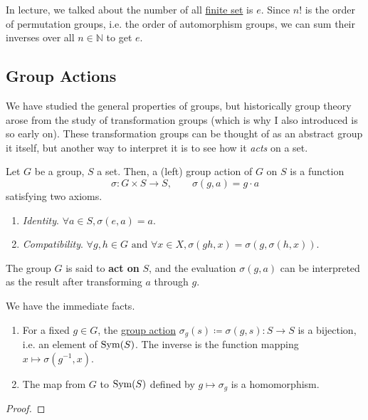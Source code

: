  In lecture, we talked about the number of all \hyperref[st-def:finite-set]{finite set} is $e$. Since $n!$ is the order of permutation groups, i.e. the order of automorphism groups, we can sum their inverses over all $n \in \mathbb{N}$ to get $e$.  

\subsection{Group Actions} 

  We have studied the general properties of groups, but historically group theory arose from the study of transformation groups (which is why I also introduced is so early on). These transformation groups can be thought of as an abstract group it itself, but another way to interpret it is to see how it \textit{acts} on a set. 

  \begin{definition}
    \label{def:group-action}
    Let $G$ be a group, $S$ a set. Then, a (left) group action of $G$ on $S$ is a function
    \begin{equation}
      \sigma: G \times S \to S, \qquad \sigma(g, a) = g \cdot a 
    \end{equation}
    satisfying two axioms. 
    \begin{enumerate}
      \item \textit{Identity}. $\forall a \in S, \sigma(e, a) = a$. 
      \item \textit{Compatibility}. $\forall g, h \in G \text{ and } \forall x \in X, \sigma(gh, x) = \sigma(g, \sigma(h, x))$.
    \end{enumerate}
    The group $G$ is said to \textbf{act on} $S$, and the evaluation $\sigma(g, a)$ can be interpreted as the result after transforming $a$ through $g$. 
  \end{definition}
  
  \begin{theorem}
    \label{thm:group-action-as-a-homomorphism-onto-the}
    We have the immediate facts. 
    \begin{enumerate}
      \item For a fixed $g \in G$, the \hyperref[def:group-action]{group action} $\sigma_g (s) \coloneqq \sigma(g, s): S \to S$ is a bijection, i.e. an element of $\operatorname{Sym}(S)$. The inverse is the function mapping $x \mapsto \sigma(g^{-1}, x)$.
      \item The map from $G$ to $\operatorname{Sym}(S)$ defined by $g \mapsto \sigma_g$ is a homomorphism. 
    \end{enumerate}
  \end{theorem}
  \begin{proof}
    
  \end{proof}

